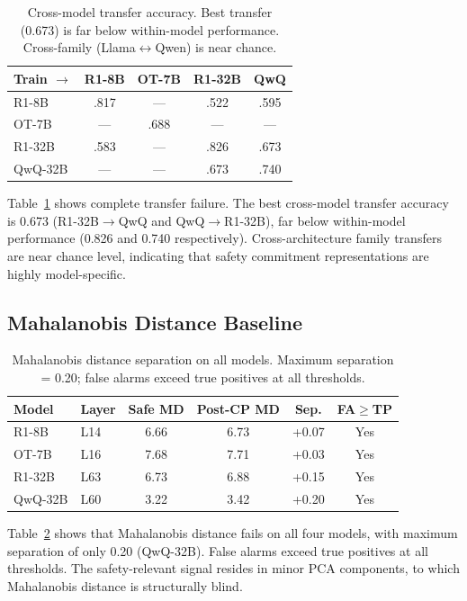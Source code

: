 \documentclass[11pt]{article}
\begin{document}
\begin{table}[t]
\centering
\small
\begin{tabular}{@{}lcccc@{}}
\toprule
\textbf{Train $\rightarrow$} & \textbf{R1-8B} & \textbf{OT-7B} & \textbf{R1-32B} & \textbf{QwQ} \\
\midrule
R1-8B & .817 & --- & .522 & .595 \\
OT-7B & --- & .688 & --- & --- \\
R1-32B & .583 & --- & .826 & .673 \\
QwQ-32B & --- & --- & .673 & .740 \\
\bottomrule
\end{tabular}
\caption{Cross-model transfer accuracy. Best transfer (0.673) is far below within-model performance. Cross-family (Llama$\leftrightarrow$Qwen) is near chance.}
\label{tab:transfer}
\end{table}

Table~\ref{tab:transfer} shows complete transfer failure.
The best cross-model transfer accuracy is 0.673 (R1-32B$\rightarrow$QwQ and QwQ$\rightarrow$R1-32B), far below within-model performance (0.826 and 0.740 respectively).
Cross-architecture family transfers are near chance level, indicating that safety commitment representations are highly model-specific.

\subsection{Mahalanobis Distance Baseline}
\label{sec:mahalanobis}

\begin{table}[t]
\centering
\small
\begin{tabular}{@{}llcccc@{}}
\toprule
\textbf{Model} & \textbf{Layer} & \textbf{Safe MD} & \textbf{Post-CP MD} & \textbf{Sep.} & \textbf{FA$\geq$TP} \\
\midrule
R1-8B & L14 & 6.66 & 6.73 & +0.07 & Yes \\
OT-7B & L16 & 7.68 & 7.71 & +0.03 & Yes \\
R1-32B & L63 & 6.73 & 6.88 & +0.15 & Yes \\
QwQ-32B & L60 & 3.22 & 3.42 & +0.20 & Yes \\
\bottomrule
\end{tabular}
\caption{Mahalanobis distance separation on all models. Maximum separation = 0.20; false alarms exceed true positives at all thresholds.}
\label{tab:mahalanobis}
\end{table}

Table~\ref{tab:mahalanobis} shows that Mahalanobis distance fails on all four models, with maximum separation of only 0.20 (QwQ-32B).
False alarms exceed true positives at all thresholds.
The safety-relevant signal resides in minor PCA components, to which Mahalanobis distance is structurally blind.
\end{document}
